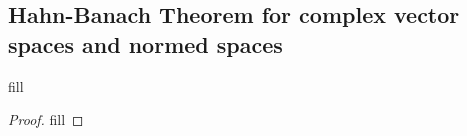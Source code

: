 \subsection{Hahn-Banach Theorem for complex vector spaces and normed spaces}

\begin{exercise}{1}
fill
\end{exercise}
\begin{proof}
fill
\end{proof}